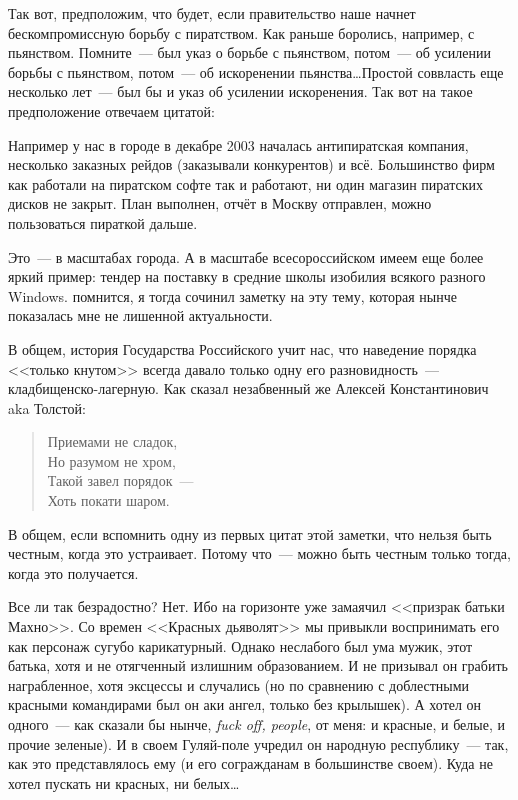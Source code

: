 Так вот, предположим, что будет, если правительство наше начнет бескомпромиссную борьбу с пиратством. Как раньше боролись, например, с пьянством. Помните~--- был указ о борьбе с пьянством, потом~--- об усилении борьбы с пьянством, потом~--- об искоренении пьянства\dots Простой соввласть еще несколько лет~--- был бы и указ об усилении искоренения. Так вот на такое предположение отвечаем цитатой:
\begin{shadequote}{}
Например у нас в городе в декабре 2003 началась антипиратская компания, несколько заказных рейдов (заказывали конкурентов) и всё. Большинство фирм как работали на пиратском софте так и работают, ни один магазин пиратских дисков не закрыт. План выполнен, отчёт в Москву отправлен, можно пользоваться пираткой дальше.
\end{shadequote}
Это~--- в масштабах города. А в масштабе всесороссийском имеем еще более яркий пример: тендер на поставку в средние школы изобилия всякого разного Windows. помнится, я тогда сочинил заметку на эту тему, которая нынче показалась мне не лишенной актуальности.

В общем, история Государства Российского учит нас, что наведение порядка <<только кнутом>> всегда давало только одну его разновидность~--- кладбищенско-лагерную. Как сказал незабвенный же Алексей Константинович aka Толстой:
\begin{verse}
Приемами не сладок,\\
Но разумом не хром,\\
Такой завел порядок~---\\
Хоть покати шаром.
\end{verse}
В общем, если вспомнить одну из первых цитат этой заметки, что нельзя быть честным, когда это устраивает. Потому что~--- можно быть честным только тогда, когда это получается.

Все ли так безрадостно? Нет. Ибо на горизонте уже замаячил <<призрак батьки Махно>>. Со времен <<Красных дьяволят>> мы привыкли воспринимать его как персонаж сугубо карикатурный. Однако  неслабого был ума мужик, этот батька, хотя и не отягченный излишним образованием. И не призывал он грабить награбленное, хотя эксцессы и случались (но по сравнению с доблестными красными командирами был он аки ангел, только без крылышек). А хотел он одного~--- как сказали бы нынче, \textit{fuck off, people}, от меня: и красные, и белые, и прочие зеленые). И в своем Гуляй-поле учредил он народную республику~--- так, как это представлялось ему (и его согражданам в большинстве своем). Куда не хотел пускать ни красных, ни белых\dots

